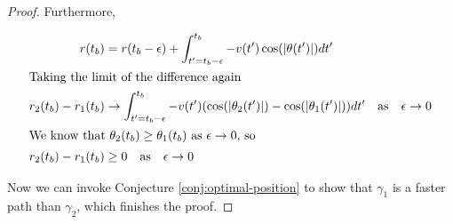 \begin{proof}
Furthermore, 

\begin{align}
  r(t_b)& = r(t_b - \epsilon) + \int_{t' = t_b - \epsilon}^{t_b} - v(t') \cos(\abs{\theta(t')}) dt'\\
  \intertext{Taking the limit of the difference again}
  r_2(t_b) - r_1(t_b)& \to \int_{t' = t_b - \epsilon}^{t_b} - v(t') \paren{\cos(\abs{\theta_2(t')}) - \cos(\abs{\theta_1(t')})} dt' \quad \text{as} \quad \epsilon \to 0\\
  \intertext{We know that $\theta_2(t_b) \ge \theta_1(t_b)$ as $\epsilon \to 0$, so}
  r_2(t_b) - r_1(t_b)& \ge 0 \quad \text{as} \quad \epsilon \to 0
\end{align}

Now we can invoke Conjecture \ref{conj:optimal-position} to show that $\gamma_1$ is a faster path than $\gamma_2$, which finishes the proof.
\end{proof}